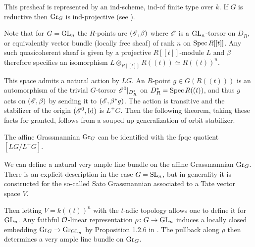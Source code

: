 \documentclass[12pt]{article}
\begin{document}
This presheaf is represented by an ind-scheme, ind-of finite type over $k$. If $G$ is reductive then $\operatorname{Gr}_G$ is ind-projective (see \cite{Zhu2016}). 

Note that for $G = \operatorname{GL}_n$ the $R$-points are $(\mathscr{E}, \beta)$ where $\mathscr{E}$ is a $\operatorname{GL}_n$-torsor on $D_R$, or equivalently vector bundle (locally free sheaf) of rank $n$ on $\operatorname{Spec} R[[t]]$. Any such quasicoherent sheaf is given by a projective $R[[t]]$-module $L$ and $\beta$ therefore specifies an isomorphism $L \otimes_{R[[t]]} R((t)) \simeq R((t))^n$.

This space admits a natural action by $LG$. An $R$-point $g \in G(R((t)))$ is an automorphism of the trivial $G$-torsor $\mathscr{E}^0 \vert_{D^*_R}$ on $D^*_R = \operatorname{Spec} R((t))$, and thus $g$ acts on $(\mathscr{E}, \beta)$ by sending it to $(\mathscr{E}, \beta^* g)$. The action is transitive and the stabilizer of the origin $(\mathscr{E}^0, \operatorname{Id})$ is $L^+G$. Then the following theorem, taking these facts for granted, follows from a souped up generalization of orbit-stabilizer.

\begin{prop}\label{cosetdescription}
    The affine Grassmannian $\operatorname{Gr}_G$ can be identified with the fpqc quotient $[LG/L^+G]$.
\end{prop}

We can define a natural very ample line bundle on the affine Grassmannian $\operatorname{Gr}_G$. There is an explicit description in the case $G = \operatorname{SL}_n$, but in generality it is constructed for the so-called Sato Grassmannian associated to a Tate vector space $V$. 

Then letting $V = k((t))^n$ with the $t$-adic topology allows one to define it for $\operatorname{GL}_n$. Any faithful $\mathcal{O}$-linear representation $\rho \colon G \to \operatorname{GL}_n$  induces a locally closed embedding $\operatorname{Gr}_G \to \operatorname{Gr}_{\operatorname{GL}_n}$ by Proposition 1.2.6 in \cite{Zhu2016}. The pullback along $\rho$ then determines a very ample line bundle on $\operatorname{Gr}_G$.
\end{document}
